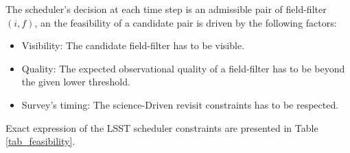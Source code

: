 \documentclass[12pt,aas_macros]{article}
\theoremstyle{definition}
\begin{document}
The scheduler's decision at each time step is an admissible pair of field-filter $(i,f)$, an the feasibility of a candidate pair is driven by the following factors:

\begin{itemize}
\item Visibility: The candidate field-filter has to be visible.
\item Quality: The expected observational quality of a field-filter has to be beyond the given lower threshold.
\item Survey's timing: The science-Driven revisit constraints has to be respected.
\end{itemize}

Exact expression of the LSST scheduler constraints are presented in Table \ref{tab_feasibility}.
\end{document}
